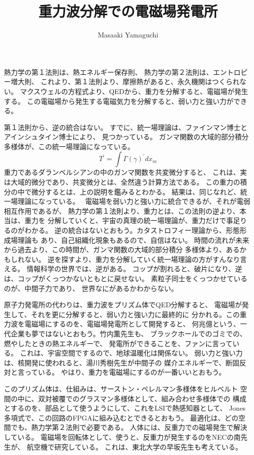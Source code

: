 \documentclass{jsarticle}
\begin{document}
\title{重力波分解での電磁場発電所}
\author{Masaaki Yamaguchi}
\date{}
\maketitle


        熱力学の第１法則は、熱エネルギー保存則、
   熱力学の第２法則は、エントロピー増大則、
   これより、第１法則より、摩擦熱があると、永久機関はつくられない。
   マクスウェルの方程式より、QEDから、重力を分解すると、電磁場が発生する。
   この電磁場から発生する電磁気力を分解すると、弱い力と強い力ができる。

   第１法則から、逆の統合はない。
   すでに、統一場理論は、ファインマン博士とアインシュタイン博士により、
   見つかっている。
   ガンマ関数の大域的部分積分多様体が、この統一場理論になっている。
   $$ T^{'} = \int \Gamma(\gamma)^{'}dx_m $$
   重力であるダランベルシアンの中のガンマ関数を共変微分すると、
   これは、実は大域的微分であり、共変微分とは、全然違う計算方法である。
   この重力の積分の中で微分するとは、上の説明を鑑みるとわかる。
   結果は、同じなれど、統一場理論になっている。　
   電磁場を弱い力と強い力に統合できるが、それが電弱相互作用であるが、
   熱力学の第１法則より、重力とは、この法則の逆より、本当は、重力を
   分解していくと、宇宙の真理の統一場理論が、重力だけで事足りるのがわかる。
   逆の統合はないとおもう。カタストロフィー理論から、形態形成場理論も
   あり、自己組織化現象もあるので、自信はない。
   時間の流れが未来から過去より、この時間が、ガンマ関数の大域的部分積分
   多様体より、あるかもしれない。
   逆を探すより、重力を分解していく統一場理論の方がすんなり言える。
   情報科学の世界では、逆がある。
   コップが割れると、破片になり、逆は、コップがくっつかないともとに戻せない。
   素粒子同士をくっつかせているのが、中間子力であり、
   世界なにがあるかわからない。



       原子力発電所の代わりは、重力波をプリズム体でQED分解すると、
   電磁場が発生して、それを更に分解すると、弱い力と強い力に最終的に
   分かれる。この重力波を電磁場にするのを、電磁場発電所として開発すると、
   何兆億という、一代企業も夢ではないとおもう。竹内薫先生も、
   ブラックホールでのゴミでの、燃やしたときの熱エネルギーで、
   発電所ができることを、ファンに言っている。
   これは、宇宙空間でするので、地球温暖化は関係ない。
   弱い力と強い力は、核開発に使われると、湯川秀樹先生が中間子の
   媒介エネルギーで、断固反対と言っている。
   やはり、重力を電磁場にするのが一番いいとおもう。




        このプリズム体は、仕組みは、サーストン・ペレルマン多様体をヒルベルト
   空間の中に、双対被覆でのグラスマン多様体として、組み合わせ多様体での
   構成とするのを、部品として使うようにして、これをLSIで熱感知器として、
   Jones多項式で、この回路のFPGAに組み込むとできるとおもう。
   最適化は、どの空間でも、熱力学第２法則で必要である。
   人体には、反重力での磁場発生で解決している。
   電磁場を回転体として、使うと、反重力が発生するのをNECの南先生が、
   航空機で研究している。
   これは、東北大学の早坂先生も考えている。　
\end{document}

